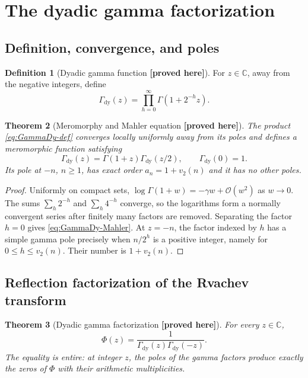 \documentclass[11pt,oneside]{article}
\newtheorem{theorem}{Theorem}[section]
\theoremstyle{definition}
\newtheorem{definition}[theorem]{Definition}
\theoremstyle{remark}
\newcommand{\C}{\mathbb C}
\newcommand{\bigO}{\mathcal O}
\newcommand{\vtwo}{v_2}
\newcommand{\GammaDy}{\Gamma_{\!\mathrm{dy}}}
\newcommand{\New}{\textcolor{amber}{\textbf{[proved here]}}}
\begin{document}
\section{The dyadic gamma factorization}
\label{sec:dyadic-gamma}

\subsection{Definition, convergence, and poles}

\begin{definition}[Dyadic gamma function \New]
For $z\in\C$, away from the negative integers, define
\begin{equation}
 \boxed{\quad
 \GammaDy(z)=\prod_{h=0}^{\infty}\Gamma(1+2^{-h}z).
 \quad}                                                  \label{eq:GammaDy-def}
\end{equation}
\end{definition}

\begin{theorem}[Meromorphy and Mahler equation \New]
The product \eqref{eq:GammaDy-def} converges locally uniformly away from its poles and defines
a meromorphic function satisfying
\begin{equation}
 \GammaDy(z)=\Gamma(1+z)\GammaDy(z/2),
 \qquad \GammaDy(0)=1.                                  \label{eq:GammaDy-Mahler}
\end{equation}
Its pole at $-n$, $n\ge1$, has exact order $a_n=1+\vtwo(n)$ and it has no other poles.
\end{theorem}

\begin{proof}
Uniformly on compact sets, $\log\Gamma(1+w)=-\gamma w+\bigO(w^2)$ as $w\to0$.
The sums $\sum_h2^{-h}$ and $\sum_h4^{-h}$ converge, so the logarithms form a normally
convergent series after finitely many factors are removed.  Separating the factor $h=0$
gives \eqref{eq:GammaDy-Mahler}.  At $z=-n$, the factor indexed by $h$ has a simple gamma
pole precisely when $n/2^h$ is a positive integer, namely for $0\le h\le\vtwo(n)$.  Their
number is $1+\vtwo(n)$.
\end{proof}

\subsection{Reflection factorization of the Rvachev transform}

\begin{theorem}[Dyadic gamma factorization \New]
For every $z\in\C$,
\begin{equation}
 \boxed{\quad
 \Phi(z)=\frac{1}{\GammaDy(z)\GammaDy(-z)}.
 \quad}                                                  \label{eq:Phi-GammaDy}
\end{equation}
The equality is entire: at integer $z$, the poles of the gamma factors produce exactly the
zeros of $\Phi$ with their arithmetic multiplicities.
\end{theorem}
\end{document}
